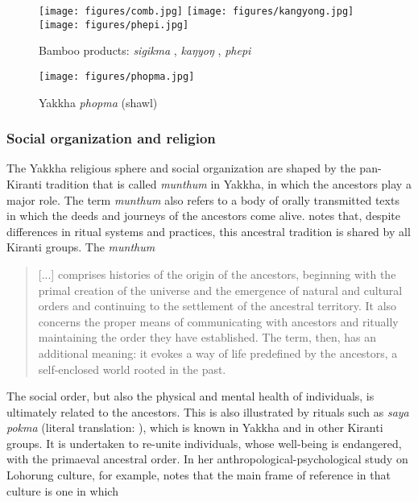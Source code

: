  \begin{figure}[h]
 \texttt{[image: figures/comb.jpg]}
 \hfill
 \texttt{[image: figures/kangyong.jpg]}
 \hfill
 \texttt{[image: figures/phepi.jpg]}
 \caption{Bamboo  products: \emph{sigikma} , \emph{kaŋyoŋ} , \emph{phepi} }\label{phabu}
 \end{figure}



\begin{figure}[h]
\centering
\texttt{[image: figures/phopma.jpg]}
\caption{Yakkha \emph{phopma} (shawl)}\label{phopma}
\end{figure}

\subsubsection{Social organization and religion}\label{social}

The Yakkha religious sphere and social organization are shaped by the pan-Kiranti tradition that is called \emph{munthum} in Yakkha, in which the ancestors play a major role. The term \emph{munthum} also refers to a body of orally transmitted texts in which the deeds and journeys of the ancestors come alive. \citet{Gaenszle_Redefining} notes that, despite differences in ritual systems and practices, this ancestral tradition is shared by  all Kiranti groups. The \emph{munthum}

\begin{quote}
[...] comprises histories of the origin of the ancestors, beginning with the primal creation of the universe and the emergence of natural and cultural orders and continuing to the settlement of the ancestral territory. It also concerns the proper means of communicating with ancestors and ritually maintaining the order they have established. The term, then, has an additional meaning: it evokes a way of life predefined by the ancestors, a self-enclosed world rooted in the past. \citep[224]{Gaenszle2000Origins}
\end{quote}

The social order, but also the physical and mental health of individuals, is ultimately related to the ancestors. This is also illustrated by rituals such as \emph{saya pokma} (literal translation: ), which is known in Yakkha and in other Kiranti groups. It is undertaken to re-unite individuals, whose well-being is endangered, with the primaeval ancestral order. In her anthropological-psychological study on Lohorung culture, for example, \citet{Hardman2000_Other} notes that the main frame of reference in that culture is one in which

